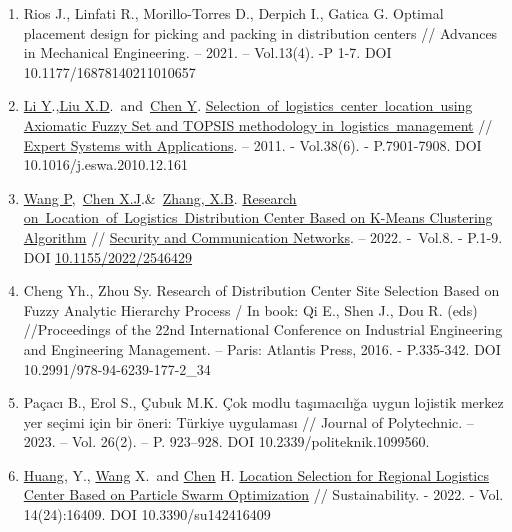 \begin{enumerate}
\def\labelenumi{\arabic{enumi}.}
\item
  Rios J., Linfati R., Morillo-Torres D., Derpich I., Gatica G. Optimal
  placement design for picking and packing in distribution centers //
  Advances in Mechanical Engineering. -- 2021. -- Vol.13(4). -P 1-7. DOI
  10.1177/16878140211010657
\item
  \href{https://www.webofscience.com/wos/author/record/28556133}{Li
  Y}.,\href{https://www.webofscience.com/wos/author/record/32561100}{Liu
  X.D}.~and~\href{https://www.webofscience.com/wos/author/record/6098832}{Chen
  Y}.
  \href{https://www.webofscience.com/wos/woscc/full-record/WOS:000288343900166}{Selection~of~logistics~center~location~using
  Axiomatic Fuzzy Set and TOPSIS methodology in~logistics~management} //
  \href{https://www.sciencedirect.com/journal/expert-systems-with-applications}{Expert
  Systems with Applications}. -- 2011. - Vol.38(6). - P.7901-7908. DOI
  10.1016/j.eswa.2010.12.161
\item
  \href{https://www.webofscience.com/wos/author/record/14795379}{Wang
  P},~\href{https://www.webofscience.com/wos/author/record/36107182}{Chen
  X.J}.\&~\href{https://www.webofscience.com/wos/author/record/32493117}{Zhang,
  X.B}.
  \href{https://www.webofscience.com/wos/woscc/full-record/WOS:000830775300005}{Research
  on~Location~of~Logistics~Distribution Center Based on K-Means
  Clustering Algorithm} //
  \href{https://www.researchgate.net/journal/Security-and-Communication-Networks-1939-0122}{Security
  and Communication Networks}. -- 2022. -~Vol.8. - P.1-9. DOI
  \href{http://dx.doi.org/10.1155/2022/2546429}{10.1155/2022/2546429}
\item
  Cheng Yh., Zhou Sy. Research of Distribution Center Site Selection
  Based on Fuzzy Analytic Hierarchy Process / In book: Qi E., Shen J.,
  Dou R. (eds) //Proceedings of the 22nd International Conference on
  Industrial Engineering and Engineering Management. -- Paris: Atlantis
  Press, 2016. - P.335-342. DOI 10.2991/978-94-6239-177-2\_34
\item
  Paçacı B., Erol S., Çubuk M.K. Çok modlu taşımacılığa uygun lojistik
  merkez yer seçimi için bir öneri: Türkiye uygulaması // Journal of
  Polytechnic. -- 2023. -- Vol. 26(2). -- P. 923--928. DOI
  10.2339/politeknik.1099560.
\item
  \href{https://sciprofiles.com/profile/693277}{Huang}, Y.,
  \href{https://sciprofiles.com/profile/2635021}{Wang} X.~and
  \href{https://sciprofiles.com/profile/author/dFBVb3FoaXR6WVFmWlV5M0h1dGNXZz09}{Chen}
  H. \href{https://www.mdpi.com/2071-1050/14/24/16409}{Location
  Selection for Regional Logistics Center Based on Particle Swarm
  Optimization} // Sustainability. - 2022. - Vol. 14(24):16409. DOI
  10.3390/su142416409
\end{enumerate}

